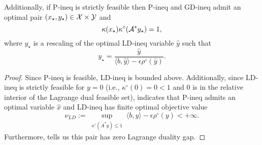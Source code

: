 \begin{enumerate}
\begin{prop}
Additionally, if P-ineq is strictly feasible then P-ineq and GD-ineq admit an optimal pair $(x_\star, y_\star) \in {\mathcal X} \times {\mathcal Y}$ and
\begin{equation} 			\label{Eqn:strong_duality_2}
\kappa(x_\star) \kappa^\circ ( {\mathcal A}^* y_\star ) = 1,
\end{equation}
where $y_\star$ is a rescaling of the optimal LD-ineq variable $\hat{y}$ such that
\begin{equation} 			\label{Eqn:strong_duality_3}
y_\star = \frac{\hat{y}}{\langle b, \hat{y} \rangle - \epsilon \rho^\circ(\hat{y})}.
\end{equation}
\end{prop}

\begin{proof}
Since P-ineq is feasible, LD-ineq is bounded above.  Additionally, since LD-ineq is strictly feasible for $y=0$ (i.e., $\kappa^\circ(0) = 0< 1$ and $0$ is in the relative interior of the Lagrange dual feasible set), \cite[Theorem 28.2]{rockafellar1970convex} indicates that P-ineq admits an optimal variable $\hat{x}$ and LD-ineq has finite optimal objective value  
\begin{equation*}
\nu_{LD} := \sup\limits_{\substack{\kappa^\circ(A^*y) \leq 1}} \langle b, y \rangle - \epsilon \rho^\circ(y)  < +\infty.
\end{equation*}
Furthermore, \cite[Theorem 28.4]{rockafellar1970convex} tells us this pair has zero Lagrange duality gap.


\end{proof}
\end{enumerate}
